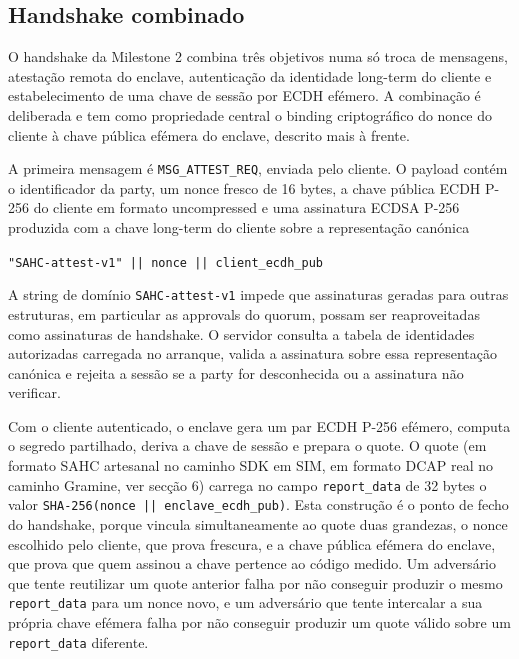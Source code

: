 \subsection{Handshake combinado}

O handshake da Milestone 2 combina três objetivos numa só troca de mensagens, atestação remota do enclave, autenticação da identidade long-term do cliente e estabelecimento de uma chave de sessão por ECDH efémero. A combinação é deliberada e tem como propriedade central o binding criptográfico do nonce do cliente à chave pública efémera do enclave, descrito mais à frente.

A primeira mensagem é \texttt{MSG\_ATTEST\_REQ}, enviada pelo cliente. O payload contém o identificador da party, um nonce fresco de 16 bytes, a chave pública ECDH P-256 do cliente em formato uncompressed e uma assinatura ECDSA P-256 produzida com a chave long-term do cliente sobre a representação canónica

\begin{center}
\texttt{"SAHC-attest-v1" || nonce || client\_ecdh\_pub}
\end{center}

\noindent A string de domínio \texttt{SAHC-attest-v1} impede que assinaturas geradas para outras estruturas, em particular as approvals do quorum, possam ser reaproveitadas como assinaturas de handshake. O servidor consulta a tabela de identidades autorizadas carregada no arranque, valida a assinatura sobre essa representação canónica e rejeita a sessão se a party for desconhecida ou a assinatura não verificar.

Com o cliente autenticado, o enclave gera um par ECDH P-256 efémero, computa o segredo partilhado, deriva a chave de sessão e prepara o quote. O quote (em formato SAHC artesanal no caminho SDK em SIM, em formato DCAP real no caminho Gramine, ver secção 6) carrega no campo \texttt{report\_data} de 32 bytes o valor \texttt{SHA-256(nonce || enclave\_ecdh\_pub)}. Esta construção é o ponto de fecho do handshake, porque vincula simultaneamente ao quote duas grandezas, o nonce escolhido pelo cliente, que prova frescura, e a chave pública efémera do enclave, que prova que quem assinou a chave pertence ao código medido. Um adversário que tente reutilizar um quote anterior falha por não conseguir produzir o mesmo \texttt{report\_data} para um nonce novo, e um adversário que tente intercalar a sua própria chave efémera falha por não conseguir produzir um quote válido sobre um \texttt{report\_data} diferente.

